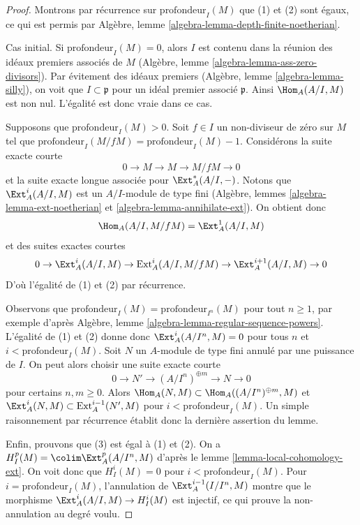 \begin{proof}
Montrons par récurrence sur $\text{profondeur}_I(M)$ que (1) et (2) sont égaux,
ce qui est permis par Algèbre, lemme \ref{algebra-lemma-depth-finite-noetherian}.

\medskip\noindent
Cas initial. Si $\text{profondeur}_I(M) = 0$, alors $I$ est contenu dans la réunion
des idéaux premiers associés de $M$
(Algèbre, lemme \ref{algebra-lemma-ass-zero-divisors}).
Par évitement des idéaux premiers (Algèbre, lemme \ref{algebra-lemma-silly}),
on voit que $I \subset \mathfrak p$ pour un idéal premier associé $\mathfrak p$.
Ainsi $\Hom_A(A/I, M)$ est non nul. L'égalité est donc vraie dans ce cas.

\medskip\noindent
Supposons que $\text{profondeur}_I(M) > 0$. Soit $f \in I$ un non-diviseur de zéro
sur $M$ tel que $\text{profondeur}_I(M/fM) = \text{profondeur}_I(M) - 1$.
Considérons la suite exacte courte
$$
0 \to M \to M \to M/fM \to 0
$$
et la suite exacte longue associée pour $\Ext^*_A(A/I, -)$.
Notons que $\Ext^i_A(A/I, M)$ est un $A/I$-module de type fini
(Algèbre, lemmes \ref{algebra-lemma-ext-noetherian} et \ref{algebra-lemma-annihilate-ext}). On obtient donc
$$
\Hom_A(A/I, M/fM) = \Ext^1_A(A/I, M)
$$
et des suites exactes courtes
$$
0 \to \Ext^i_A(A/I, M) \to \text{Ext}^i_A(A/I, M/fM) \to
\Ext^{i + 1}_A(A/I, M) \to 0
$$
D'où l'égalité de (1) et (2) par récurrence.

\medskip\noindent
Observons que $\text{profondeur}_I(M) = \text{profondeur}_{I^n}(M)$ pour tout $n \geq 1$,
par exemple d'après Algèbre, lemme \ref{algebra-lemma-regular-sequence-powers}.
L'égalité de (1) et (2) donne donc $\Ext^i_A(A/I^n, M) = 0$ pour tous $n$ et $i < \text{profondeur}_I(M)$.
Soit $N$ un $A$-module de type fini annulé par une puissance de $I$.
On peut alors choisir une suite exacte courte
$$
0 \to N' \to (A/I^n)^{\oplus m} \to N \to 0
$$
pour certains $n, m \geq 0$. Alors
$\Hom_A(N, M) \subset \Hom_A((A/I^n)^{\oplus m}, M)$
et
$\Ext^i_A(N, M) \subset \text{Ext}^{i - 1}_A(N', M)$
pour $i < \text{profondeur}_I(M)$. Un simple raisonnement par récurrence
établit donc la dernière assertion du lemme.

\medskip\noindent
Enfin, prouvons que (3) est égal à (1) et (2).
On a $H^p_I(M) = \colim \Ext^p_A(A/I^n, M)$ d'après le lemme \ref{lemma-local-cohomology-ext}.
On voit donc que $H^i_I(M) = 0$ pour $i < \text{profondeur}_I(M)$.
Pour $i = \text{profondeur}_I(M)$, l'annulation de $\Ext_A^{i - 1}(I/I^n, M)$ montre que le morphisme
$\Ext_A^i(A/I, M) \to H_I^i(M)$ est injectif, ce qui prouve la non-annulation au degré voulu.
\end{proof}

